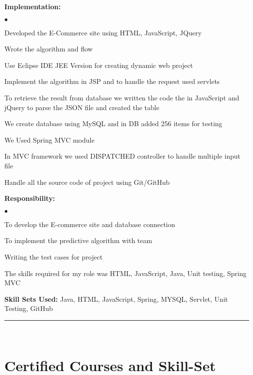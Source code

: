 \documentclass[letterpaper,margin,line]{RES}
\newenvironment{list2}{
  \begin{list}{$\bullet$}{%
      \setlength{\itemsep}{1pt}
      \setlength{\parsep}{0in} \setlength{\parskip}{0in}
      \setlength{\topsep}{0in} \setlength{\partopsep}{0in} 
      \setlength{\leftmargin}{0.2in}}}{\end{list}}
\def\mmmyline{\rule{\textwidth}{1pt}\\}
\begin{document}
\begin{resume}
{\bf Implementation:}
\\

\begin{list2}
\item Developed the E-Commerce site using HTML, JavaScript, JQuery
\item Wrote the algorithm and flow
\item Use Eclipse IDE JEE Version for creating dynamic web project
\item Implement the algorithm in JSP and to handle the request used servlets
\item To retrieve the result from database we written the code the in JavaScript and jQuery to parse the JSON file and created the table
\item We create database using MySQL and in DB added 256 items for testing
\item We Used Spring MVC module
\item In MVC framework we used DISPATCHED controller to handle multiple input file
\item Handle all the source code of project using Git/GitHub 
\end{list2}

{\bf Responsibility:}
\\

\begin{list2}
\item 	To develop the E-commerce site and database connection
\item 	To implement the predictive algorithm with team
\item 	Writing the test cases for project
\item 	The skills required for my role was HTML, JavaScript, Java, Unit testing, Spring MVC
 
\end{list2}

{\bf Skill Sets Used:}
Java, HTML, JavaScript, Spring, MYSQL, Servlet, Unit Testing, GitHub

\mmmyline


\section{\sc Certified Courses and Skill-Set }
\begin{tabular}{@{}p{4in}p{.75in}p{.75in}}


\end{tabular}
\end{resume}
\end{document}
